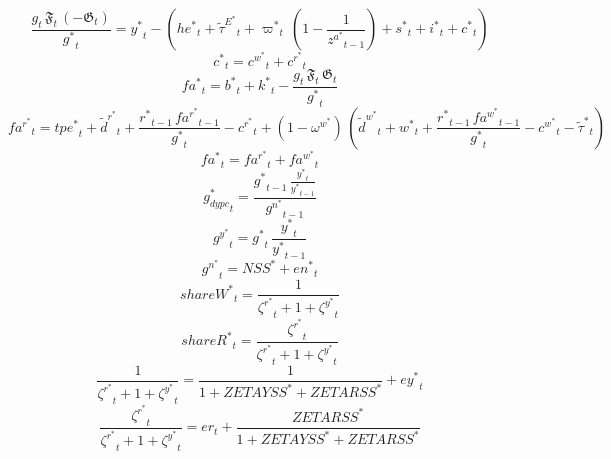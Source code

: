 \begin{dmath}
\frac{{{g}}_{t}\, {{\mathfrak{F}}}_{t}\, \left(-{{\mathfrak{G}}}_{t}\right)}{{{g^*}}_{t}}={{y^*}}_{t}-\left({{he^*}}_{t}+{\tilde{\tau}^E^*}_{t}+{{\varpi^*}}_{t}\, \left(1-\frac{1}{{{z^a^*}}_{t-1}}\right)+{{s^*}}_{t}+{{i^*}}_{t}+{{c^*}}_{t}\right)
\end{dmath}
\begin{dmath}
{{c^*}}_{t}={{c^w^*}}_{t}+{{c^r^*}}_{t}
\end{dmath}
\begin{dmath}
{{fa^*}}_{t}={{b^*}}_{t}+{{k^*}}_{t}-\frac{{{g}}_{t}\, {{\mathfrak{F}}}_{t}\, {{\mathfrak{G}}}_{t}}{{{g^*}}_{t}}
\end{dmath}
\begin{dmath}
{{fa^r^*}}_{t}={{tpe^*}}_{t}+{\tilde{d}^r^*}_{t}+\frac{{{r^*}}_{t-1}\, {{fa^r^*}}_{t-1}}{{{g^*}}_{t}}-{{c^r^*}}_{t}+\left(1-{{\omega^w^*}}\right)\, \left({\tilde{d}^w^*}_{t}+{{w^*}}_{t}+\frac{{{r^*}}_{t-1}\, {{fa^w^*}}_{t-1}}{{{g^*}}_{t}}-{{c^w^*}}_{t}-{\tilde{\tau}^*}_{t}\right)
\end{dmath}
\begin{dmath}
{{fa^*}}_{t}={{fa^r^*}}_{t}+{{fa^w^*}}_{t}
\end{dmath}
\begin{dmath}
{{g_{dypc}^*}}_{t}=\frac{{{g^*}}_{t-1}\, \frac{{{y^*}}_{t}}{{{y^*}}_{t-1}}}{{{g^n^*}}_{t-1}}
\end{dmath}
\begin{dmath}
{{g^y^*}}_{t}={{g^*}}_{t}\, \frac{{{y^*}}_{t}}{{{y^*}}_{t-1}}
\end{dmath}
\begin{dmath}
{{g^n^*}}_{t}={{NSS^*}}+{{en^*}}_{t}
\end{dmath}
\begin{dmath}
{{shareW^*}}_{t}=\frac{1}{{{\zeta^r^*}}_{t}+1+{{\zeta^y^*}}_{t}}
\end{dmath}
\begin{dmath}
{{shareR^*}}_{t}=\frac{{{\zeta^r^*}}_{t}}{{{\zeta^r^*}}_{t}+1+{{\zeta^y^*}}_{t}}
\end{dmath}
\begin{dmath}
\frac{1}{{{\zeta^r^*}}_{t}+1+{{\zeta^y^*}}_{t}}=\frac{1}{1+{{ZETAYSS^*}}+{{ZETARSS^*}}}+{{ey^*}}_{t}
\end{dmath}
\begin{dmath}
\frac{{{\zeta^r^*}}_{t}}{{{\zeta^r^*}}_{t}+1+{{\zeta^y^*}}_{t}}={{er}}_{t}+\frac{{{ZETARSS^*}}}{1+{{ZETAYSS^*}}+{{ZETARSS^*}}}
\end{dmath}
